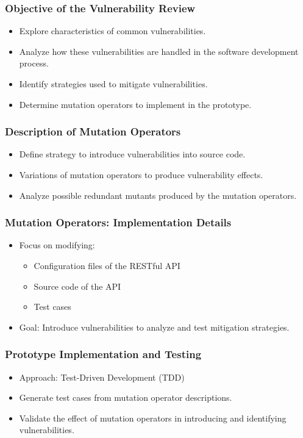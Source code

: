 \documentclass[10pt]{beamer}
\theoremstyle{remark}
\theoremstyle{definition}
\begin{document}
\begin{frame}
    \frametitle{Objective of the Vulnerability Review}
    \begin{itemize}
        \item Explore characteristics of common vulnerabilities.
        \item Analyze how these vulnerabilities are handled in the software development process.
        \item Identify strategies used to mitigate vulnerabilities.
        \item Determine mutation operators to implement in the prototype.
    \end{itemize}
\end{frame}

\begin{frame}
    \frametitle{Description of Mutation Operators}
    \begin{itemize}
        \item Define strategy to introduce vulnerabilities into source code.
        \item Variations of mutation operators to produce vulnerability effects.
        \item Analyze possible redundant mutants produced by the mutation operators.
    \end{itemize}
\end{frame}

\begin{frame}
    \frametitle{Mutation Operators: Implementation Details}
    \begin{itemize}
        \item Focus on modifying:
        \begin{itemize}
            \item Configuration files of the RESTful API
            \item Source code of the API
            \item Test cases
        \end{itemize}
        \item Goal: Introduce vulnerabilities to analyze and test mitigation strategies.
    \end{itemize}
\end{frame}

\begin{frame}
    \frametitle{Prototype Implementation and Testing}
    \begin{itemize}
        \item Approach: Test-Driven Development (TDD) \cite{williams2003test}
        \item Generate test cases from mutation operator descriptions.
        \item Validate the effect of mutation operators in introducing and identifying vulnerabilities.
    \end{itemize}
\end{frame}
\end{document}

